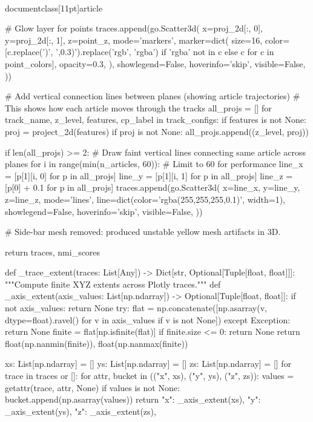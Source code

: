 \\documentclass[11pt]{article}
\begin{document}
\begin{CodeBlock}
{{{        # Glow layer for points
        traces.append(go.Scatter3d(
            x=proj_2d[:, 0],
            y=proj_2d[:, 1],
            z=point_z,
            mode='markers',
            marker=dict(
                size=16,
                color=[c.replace(')', ',0.3)').replace('rgb', 'rgba') if 'rgba' not in c
                       else c for c in point_colors],
                opacity=0.3,
            ),
            showlegend=False,
            hoverinfo='skip',
            visible=False,
        ))

    # Add vertical connection lines between planes (showing article trajectories)
    # This shows how each article moves through the tracks
    all_projs = []
    for track_name, z_level, features, cp_label in track_configs:
        if features is not None:
            proj = project_2d(features)
            if proj is not None:
                all_projs.append((z_level, proj))

    if len(all_projs) >= 2:
        # Draw faint vertical lines connecting same article across planes
        for i in range(min(n_articles, 60)):  # Limit to 60 for performance
            line_x = [p[1][i, 0] for p in all_projs]
            line_y = [p[1][i, 1] for p in all_projs]
            line_z = [p[0] + 0.1 for p in all_projs]
            traces.append(go.Scatter3d(
                x=line_x,
                y=line_y,
                z=line_z,
                mode='lines',
                line=dict(color='rgba(255,255,255,0.1)', width=1),
                showlegend=False,
                hoverinfo='skip',
                visible=False,
            ))

    # Side-bar mesh removed: produced unstable yellow mesh artifacts in 3D.

    return traces, nmi_scores


def _trace_extent(traces: List[Any]) -> Dict[str, Optional[Tuple[float, float]]]:
    """Compute finite XYZ extents across Plotly traces."""
    def _axis_extent(axis_values: List[np.ndarray]) -> Optional[Tuple[float, float]]:
        if not axis_values:
            return None
        try:
            flat = np.concatenate([np.asarray(v, dtype=float).ravel() for v in axis_values if v is not None])
        except Exception:
            return None
        finite = flat[np.isfinite(flat)]
        if finite.size <= 0:
            return None
        return float(np.nanmin(finite)), float(np.nanmax(finite))

    xs: List[np.ndarray] = []
    ys: List[np.ndarray] = []
    zs: List[np.ndarray] = []
    for trace in traces or []:
        for attr, bucket in (("x", xs), ("y", ys), ("z", zs)):
            values = getattr(trace, attr, None)
            if values is not None:
                bucket.append(np.asarray(values))
    return {
        "x": _axis_extent(xs),
        "y": _axis_extent(ys),
        "z": _axis_extent(zs),
    }


}}}
\end{CodeBlock}
\end{document}

